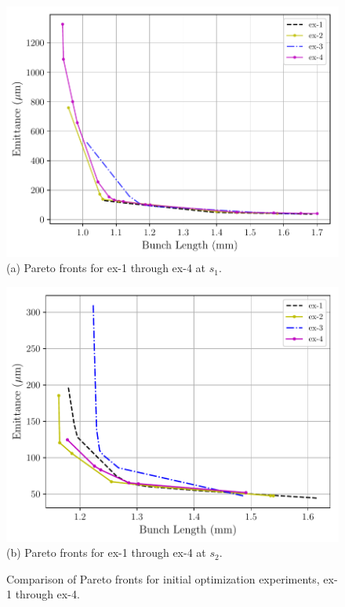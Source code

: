 \begin{figure}
	\centering
	\begin{minipage}{0.49\textwidth}
		\centering
		\includegraphics[width=\textwidth]{Report/ex-pareto1}
		(a) Pareto fronts for ex-1 through ex-4 at $s_1$.
		\vspace{2em}
	\end{minipage}
	\begin{minipage}{0.49\textwidth}
		\centering
		\includegraphics[width=\textwidth]{Report/ex-pareto2}
		(b) Pareto fronts for ex-1 through ex-4 at $s_2$.
	\end{minipage}
	\caption{Comparison of Pareto fronts for initial optimization experiments, ex-1 through ex-4.}
	\label{expareto}
\end{figure}






